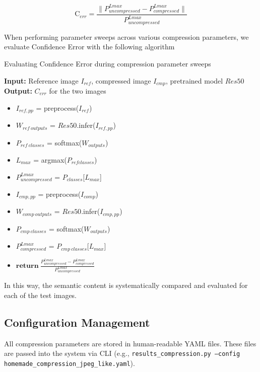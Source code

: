 $$
\textrm{C}_{err} = \frac{\|P^{Lmax}_{uncompressed} - P^{Lmax}_{compressed}\|}{P^{Lmax}_{uncompressed}}
$$

When performing parameter sweeps across various compression parameters, we evaluate Confidence Error with the following algorithm
\begin{algorithm}
    \label{alg:Confidence Error Algorithm}
    \caption{Evaluating Confidence Error during compression parameter sweeps}
    \textbf{Input: } Reference image $I_{ref}$, compressed image $I_{cmp}$, pretrained model $Res50$
    \textbf{Output: } $C_{err}$ for the two images
    \begin{itemize}
        \item $I_{ref, pp}$ = preprocess($I_{ref}$)
        \item $W_{ref \ outputs}$ = $Res50$.infer($I_{ref, pp}$)
        \item $P_{ref \ classes}$ = softmax($W_{outputs}$)
        \item $L_{max}$ = argmax({$P_{ref classes}$})
        \item $P^{Lmax}_{uncompressed}$ = $P_{classes}$[$L_{max}$]
        \item $I_{cmp, pp}$ = preprocess($I_{comp}$)
        \item $W_{comp \ outputs}$ = $Res50$.infer($I_{cmp, pp}$)
        \item $P_{cmp \ classes}$ = softmax($W_{outputs}$)
        \item $P^{Lmax}_{compressed}$ =  $P_{cmp \ classes}$[$L_{max}$]
        \item $\textbf{return}\ \frac{P^{Lmax}_{uncompressed} - P^{Lmax}_{compressed}}{P^{Lmax}_{uncompressed}}$
        \end{itemize}
    \end{algorithm}


In this way, the semantic content is systematically compared and evaluated for each of the test images.

\subsection{Configuration Management}
\label{sec:config_management}
All compression parameters are stored in human-readable YAML files. These files are passed into the system via CLI (e.g., \texttt{results\_compression.py --config homemade\_compression\_jpeg\_like.yaml}).

